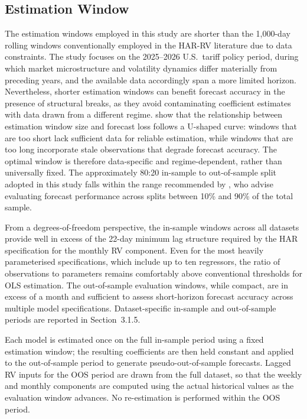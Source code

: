 \documentclass[12pt,a4paper]{report}
\begin{document}
\subsection{Estimation Window}
The estimation windows employed in this study are shorter than the 1,000-day rolling windows conventionally employed in the HAR-RV literature \citep{Corsi2009, ClementsPreve2021} due to data constraints. The study focuses on the 2025--2026 U.S.\ tariff policy period, during which market microstructure and volatility dynamics differ materially from preceding years, and the available data accordingly span a more limited horizon. Nevertheless, shorter estimation windows can benefit forecast accuracy in the presence of structural breaks, as they avoid contaminating coefficient estimates with data drawn from a different regime. \citet{FengZhang2025} show that the relationship between estimation window size and forecast loss follows a U-shaped curve: windows that are too short lack sufficient data for reliable estimation, while windows that are too long incorporate stale observations that degrade forecast accuracy. The optimal window is therefore data-specific and regime-dependent, rather than universally fixed. The approximately 80:20 in-sample to out-of-sample split adopted in this study falls within the range recommended by \citet{HansenTimmermann2012}, who advise evaluating forecast performance across splits between 10\% and 90\% of the total sample.

From a degrees-of-freedom perspective, the in-sample windows across all datasets provide well in excess of the 22-day minimum lag structure required by the HAR specification for the monthly RV component. Even for the most heavily parameterised specifications, which include up to ten regressors, the ratio of observations to parameters remains comfortably above conventional thresholds for OLS estimation. The out-of-sample evaluation windows, while compact, are in excess of a month and sufficient to assess short-horizon forecast accuracy across multiple model specifications. Dataset-specific in-sample and out-of-sample periods are reported in Section~3.1.5.

Each model is estimated once on the full in-sample period using a fixed estimation window; the resulting coefficients are then held constant and applied to the out-of-sample period to generate pseudo-out-of-sample forecasts. Lagged RV inputs for the OOS period are drawn from the full dataset, so that the weekly and monthly components are computed using the actual historical values as the evaluation window advances. No re-estimation is performed within the OOS period.
\end{document}
